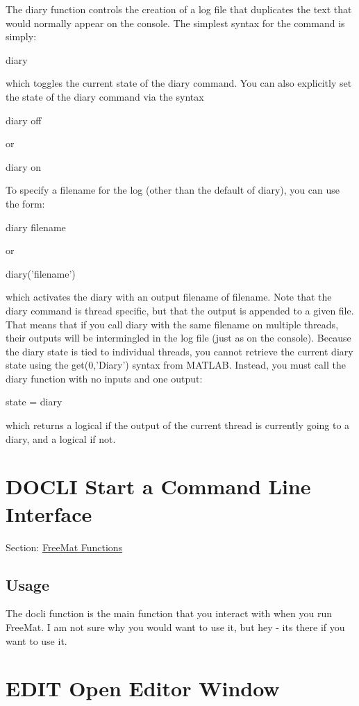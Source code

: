 The {\ttfamily diary} function controls the creation of a log file that duplicates the text that would normally appear on the console. The simplest syntax for the command is simply\-: \begin{DoxyVerb}   diary
\end{DoxyVerb}
 which toggles the current state of the diary command. You can also explicitly set the state of the diary command via the syntax \begin{DoxyVerb}   diary off
\end{DoxyVerb}
 or \begin{DoxyVerb}   diary on
\end{DoxyVerb}
 To specify a filename for the log (other than the default of {\ttfamily diary}), you can use the form\-: \begin{DoxyVerb}   diary filename
\end{DoxyVerb}
 or \begin{DoxyVerb}   diary('filename')
\end{DoxyVerb}
 which activates the diary with an output filename of {\ttfamily filename}. Note that the {\ttfamily diary} command is thread specific, but that the output is appended to a given file. That means that if you call {\ttfamily diary} with the same filename on multiple threads, their outputs will be intermingled in the log file (just as on the console). Because the {\ttfamily diary} state is tied to individual threads, you cannot retrieve the current diary state using the {\ttfamily get(0,'Diary')} syntax from M\-A\-T\-L\-A\-B. Instead, you must call the {\ttfamily diary} function with no inputs and one output\-: \begin{DoxyVerb}   state = diary
\end{DoxyVerb}
 which returns a logical {} if the output of the current thread is currently going to a diary, and a logical {} if not. \hypertarget{freemat_docli}{}\section{D\-O\-C\-L\-I Start a Command Line Interface}\label{freemat_docli}
Section\-: \hyperlink{sec_freemat}{Free\-Mat Functions} \hypertarget{vtkwidgets_vtkxyplotwidget_Usage}{}\subsection{Usage}\label{vtkwidgets_vtkxyplotwidget_Usage}
The {\ttfamily docli} function is the main function that you interact with when you run Free\-Mat. I am not sure why you would want to use it, but hey -\/ its there if you want to use it. \hypertarget{freemat_edit}{}\section{E\-D\-I\-T Open Editor Window}\label{freemat_edit}
